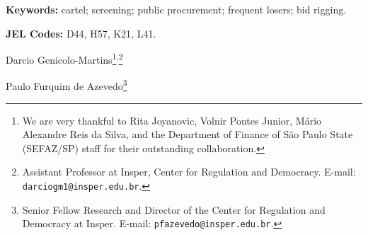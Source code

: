 \maketitle

\begin{abstract}
The systematic loss by firms of public tenders in which they participate for long periods and several times may indicate a cartel. This paper proposes a screening method to detect cartels in public tenders by considering frequent losers---firms identified as outliers through the interquartile range of losses among ``always loser'' bidders. Using administrative data on over 3.8 million transactions from the electronic procurement platform of S\~{a}o Paulo State, Brazil, from 2009 to 2019, we estimate that tenders with frequent losers are associated with approximately 10\% higher negotiated prices, 32\% more participating firms, and 29\% more bids. The simultaneous occurrence of higher prices and inflated competition indicators is inconsistent with competitive or tacit collusion models but consistent with explicit cartel behavior combined with a detection-avoidance strategy. These results are robust to alternative IQR thresholds, continuous treatment measures, multi-way clustering, coarsened exact matching, inverse probability weighting, and a staggered difference-in-differences design exploiting the timing of frequent losers' first entry into item markets. The proposed method addresses two limitations of traditional screening methods: (i) it distinguishes explicit from tacit collusion, and (ii) it enables ex-ante identification of suspicious behavior before the conclusion of public tender processes.
\end{abstract}

\medskip

\noindent \textbf{Keywords:} cartel; screening; public procurement; frequent losers; bid rigging.

\medskip

\noindent \textbf{JEL Codes:} D44, H57, K21, L41.

\bigskip

\noindent Darcio Genicolo-Martins\footnote{We are very thankful to Rita Joyanovic, Volnir Pontes Junior, M\'{a}rio Alexandre Reis da Silva, and the Department of Finance of S\~{a}o Paulo State (SEFAZ/SP) staff for their outstanding collaboration.}\textsuperscript{,}\footnote{Assistant Professor at Insper, Center for Regulation and Democracy. E-mail: \texttt{darciogm1@insper.edu.br}.}

\medskip

\noindent Paulo Furquim de Azevedo\footnote{Senior Fellow Research and Director of the Center for Regulation and Democracy at Insper. E-mail: \texttt{pfazevedo@insper.edu.br}.}
